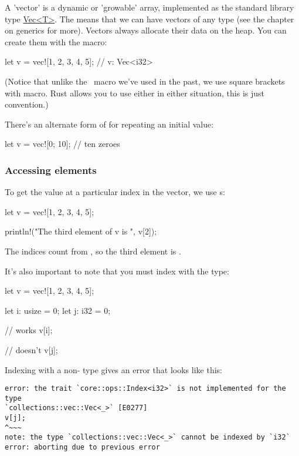 A 'vector' is a dynamic or 'growable' array, implemented as the standard library type \href{https://doc.rust-lang.org/std/vec/}{Vec<T>}. The 
 means that we can have vectors of any type (see the chapter on generics for more). Vectors always allocate their data on the heap. 
You can create them with the  macro:

\begin{rustc}
let v = vec![1, 2, 3, 4, 5]; // v: Vec<i32>
\end{rustc}

(Notice that unlike the \println\ macro we've used in the past, we use square brackets \code{[]} with  macro. Rust allows you to 
use either in either situation, this is just convention.)

\blank

There's an alternate form of  for repeating an initial value:

\begin{rustc}
let v = vec![0; 10]; // ten zeroes
\end{rustc}

\subsubsection*{Accessing elements}

To get the value at a particular index in the vector, we use \code{[]}s:

\begin{rustc}
let v = vec![1, 2, 3, 4, 5];

println!("The third element of v is {}", v[2]);
\end{rustc}

The indices count from , so the third element is .

\blank

It's also important to note that you must index with the  type:

\begin{rustc}
let v = vec![1, 2, 3, 4, 5];

let i: usize = 0;
let j: i32 = 0;

// works
v[i];

// doesn't
v[j];
\end{rustc}

Indexing with a non- type gives an error that looks like this:

\begin{verbatim}
error: the trait `core::ops::Index<i32>` is not implemented for the type
`collections::vec::Vec<_>` [E0277]
v[j];
^~~~
note: the type `collections::vec::Vec<_>` cannot be indexed by `i32`
error: aborting due to previous error
\end{verbatim}

